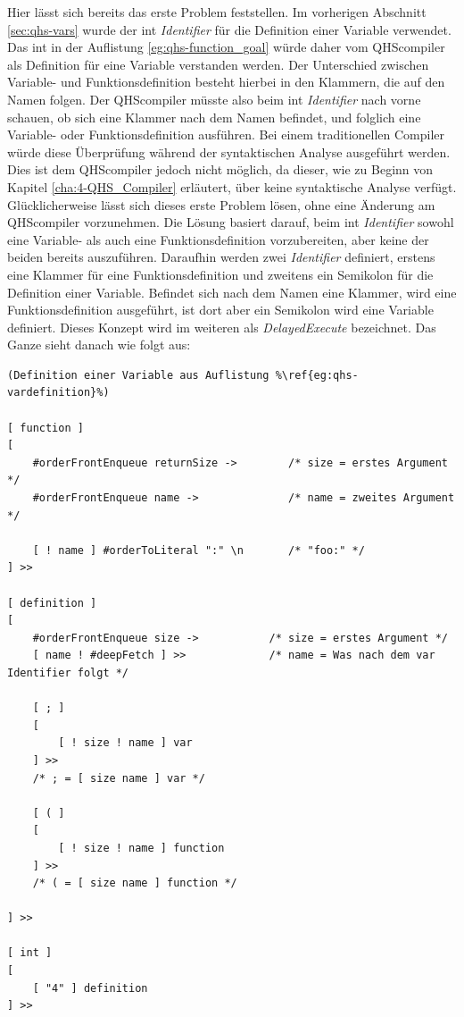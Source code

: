 Hier lässt sich bereits das erste Problem feststellen. Im vorherigen Abschnitt \ref{sec:qhs-vars} wurde der {\selectListingFont int} \textit{Identifier} für die Definition einer Variable verwendet. 
Das {\selectListingFont int} in der Auflistung \ref{eg:qhs-function_goal} würde daher vom QHScompiler als Definition für eine Variable verstanden werden.
Der Unterschied zwischen Variable- und Funktionsdefinition besteht hierbei in den Klammern, die auf den Namen folgen.
Der QHScompiler müsste also beim {\selectListingFont int} \textit{Identifier} nach vorne schauen, ob sich eine Klammer nach dem Namen befindet, und folglich eine Variable- oder Funktionsdefinition ausführen.
Bei einem traditionellen Compiler würde diese Überprüfung während der syntaktischen Analyse ausgeführt werden.
Dies ist dem QHScompiler jedoch nicht möglich, da dieser, wie zu Beginn von Kapitel \ref{cha:4-QHS_Compiler} erläutert, über keine syntaktische Analyse verfügt.
Glücklicherweise lässt sich dieses erste Problem lösen, ohne eine Änderung am QHScompiler vorzunehmen.
Die Lösung basiert darauf, beim {\selectListingFont int} \textit{Identifier} sowohl eine Variable- als auch eine Funktionsdefinition vorzubereiten, aber keine der beiden bereits auszuführen.
Daraufhin werden zwei \textit{Identifier} definiert, erstens eine Klammer für eine Funktionsdefinition und zweitens ein Semikolon für die Definition einer Variable.
Befindet sich nach dem Namen eine Klammer, wird eine Funktionsdefinition ausgeführt, ist dort aber ein Semikolon wird eine Variable definiert.
Dieses Konzept wird im weiteren als \textit{DelayedExecute} bezeichnet. Das Ganze sieht danach wie folgt aus:

\begin{minipage}{\linewidth}
\begin{lstlisting}[language=QHS, caption=Implementation eines \textit{DelayedExecute} für Definitionen]
(Definition einer Variable aus Auflistung %\ref{eg:qhs-vardefinition}%)

[ function ]
[
    #orderFrontEnqueue returnSize ->        /* size = erstes Argument */
    #orderFrontEnqueue name ->              /* name = zweites Argument */

    [ ! name ] #orderToLiteral ":" \n       /* "foo:" */
] >>

[ definition ]
[
    #orderFrontEnqueue size ->           /* size = erstes Argument */
    [ name ! #deepFetch ] >>             /* name = Was nach dem var Identifier folgt */

    [ ; ]
    [
        [ ! size ! name ] var 
    ] >>
    /* ; = [ size name ] var */

    [ ( ]
    [
        [ ! size ! name ] function 
    ] >>
    /* ( = [ size name ] function */

] >>

[ int ]
[
    [ "4" ] definition
] >>
\end{lstlisting}
\end{minipage}


